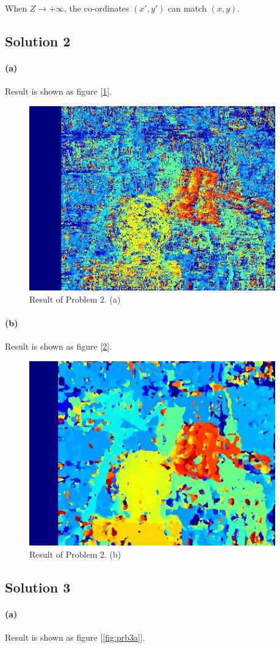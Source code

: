 \documentclass{article}
\newcommand{\solution}[1]{\clearpage \subsection*{Solution #1}}
\newcommand{\spart}[1]{\paragraph{(#1)}}
\begin{document}
When $Z \to +\infty$, the co-ordinates $(x', y')$ can match $(x, y)$.

\solution{2} 

\spart{a} Result is shown as figure [\ref{fig:prb2a}].

\begin{figure}[!h]
  \centering
  \includegraphics[height=8cm]{code/outputs/prob2a.jpg}
  \caption{Result of Problem 2. (a)}
  \label{fig:prb2a}
\end{figure}

\spart{b} Result is shown as figure [\ref{fig:prb2b}].

\begin{figure}[!h]
  \centering
  \includegraphics[height=8cm]{code/outputs/prob2b.jpg}
  \caption{Result of Problem 2. (b)}
  \label{fig:prb2b}
\end{figure}

\solution{3} 

\spart{a} Result is shown as figure [\ref{fig:prb3a}].
\end{document}
